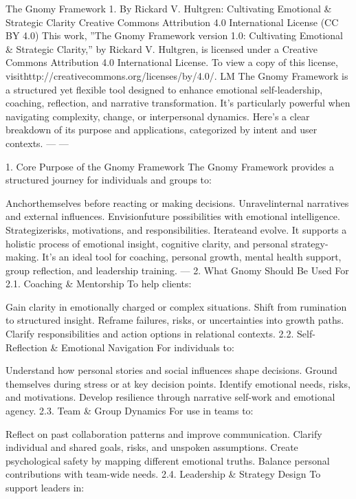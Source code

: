 The Gnomy Framework 1.
By Rickard V. Hultgren: Cultivating Emotional & Strategic Clarity
Creative Commons Attribution 4.0 International License (CC BY 4.0)
This work, ”The Gnomy Framework version 1.0: Cultivating Emotional & Strategic Clarity,” by Rickard
V. Hultgren, is licensed under a Creative Commons Attribution 4.0 International License. To view a copy
of this license, visithttp://creativecommons.org/licenses/by/4.0/.
LM
The Gnomy Framework is a structured yet flexible tool designed to enhance emotional self-leadership,
coaching, reflection, and narrative transformation. It’s particularly powerful when navigating complexity,
change, or interpersonal dynamics. Here’s a clear breakdown of its purpose and applications, categorized
by intent and user contexts.
— —

1.
Core Purpose of the Gnomy Framework
The Gnomy Framework provides a structured journey for individuals and groups to:

Anchorthemselves before reacting or making decisions.
Unravelinternal narratives and external influences.
Envisionfuture possibilities with emotional intelligence.
Strategizerisks, motivations, and responsibilities.
Iterateand evolve.
It supports a holistic process of emotional insight, cognitive clarity, and personal strategy-making. It’s an
ideal tool for coaching, personal growth, mental health support, group reflection, and leadership training.
—
2.
What Gnomy Should Be Used For
2.1. Coaching & Mentorship
To help clients:

Gain clarity in emotionally charged or complex situations.
Shift from rumination to structured insight.
Reframe failures, risks, or uncertainties into growth paths.
Clarify responsibilities and action options in relational contexts.
2.2. Self-Reflection & Emotional Navigation
For individuals to:

Understand how personal stories and social influences shape decisions.
Ground themselves during stress or at key decision points.
Identify emotional needs, risks, and motivations.
Develop resilience through narrative self-work and emotional agency.
2.3. Team & Group Dynamics
For use in teams to:

Reflect on past collaboration patterns and improve communication.
Clarify individual and shared goals, risks, and unspoken assumptions.
Create psychological safety by mapping different emotional truths.
Balance personal contributions with team-wide needs.
2.4. Leadership & Strategy Design
To support leaders in:

